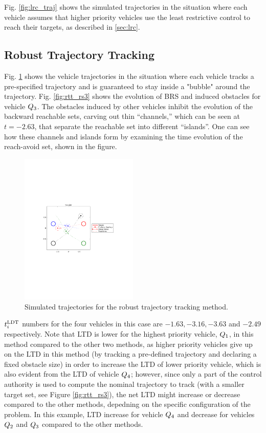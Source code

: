 Fig. \ref{fig:lrc_traj} shows the simulated trajectories in the situation where each vehicle assumes that higher priority vehicles use the least restrictive control to reach their targets, as described in \ref{sec:lrc}.

\subsection{Robust Trajectory Tracking}
Fig. \ref{fig:rtt_traj} shows the vehicle trajectories in the situation where each vehicle tracks a pre-specified trajectory and is guaranteed to stay inside a "bubble" around the trajectory. Fig. \ref{fig:rtt_rs3} shows the evolution of BRS and induced obstacles for vehicle $Q_3$. The obstacles induced by other vehicles inhibit the evolution of the backward reachable sets, carving out thin “channels,” which can be seen at $t = -2.63$, that separate the reachable set into different “islands”. One can see how these channels and islands form by examining the time evolution of the reach-avoid set, shown in the figure.

\begin{figure}
  \centering
  \includegraphics[width=0.5\textwidth]{"fig/rtt_traj"}
  \caption{Simulated trajectories for the robust trajectory tracking method.}
  \label{fig:rtt_traj}
\end{figure}

$t^\text{LDT}_i$ numbers for the four vehicles in this case are $-1.63, -3.16, -3.63$ and $-2.49$ respectively. Note that LTD is lower for the highest priority vehicle, $Q_1$, in this method compared to the other two methods, as higher priority vehicles give up on the LTD in this method (by tracking a pre-defined trajectory and declaring a fixed obstacle size) in order to increase the LTD of lower priority vehicle, which is also evident from the LTD of vehicle $Q_4$; however, since only a part of the control authority is used to compute the nominal trajectory to track (with a smaller target set, see Figure \ref{fig:rtt_rs3}), the net LTD might increase or decrease compared to the other methods, depedning on the specific configuration of the problem. In this example, LTD increase for vehicle $Q_4$ and decrease for vehicles $Q_2$ and $Q_3$ compared to the other methods.     

